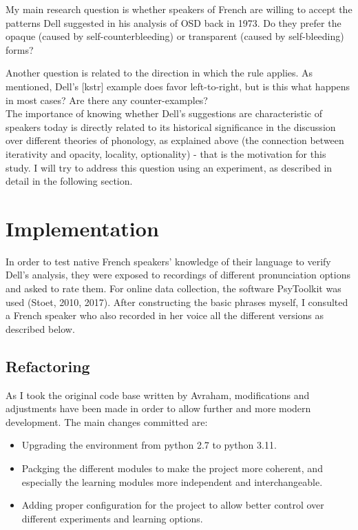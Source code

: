 \documentclass{article}
\begin{document}
My main research question is whether speakers of French are willing to accept the patterns Dell suggested in his analysis of OSD back in 1973.  Do they prefer the opaque (caused by self-counterbleeding) or transparent (caused by self-bleeding) forms?

Another question is related to the direction in which the rule applies. As mentioned,  Dell's [kstr] example does favor left-to-right, but is this what happens in most cases? Are there any counter-examples?\\

The importance of knowing whether Dell's suggestions are characteristic of speakers today is directly related to its historical significance in the discussion over different theories of phonology,  as explained above (the connection between iterativity and opacity, locality, optionality) - that is the motivation for this study. I will try to address this question using an experiment, as described in detail in the following section.

\clearpage
\section{Implementation} 
In order to test native French speakers' knowledge of their language to verify Dell's analysis, they were exposed to recordings of different pronunciation options and asked to rate them.  For online data collection,  the software PsyToolkit was used (Stoet, 2010, 2017). After constructing the basic phrases myself, I consulted a French speaker who also recorded in her voice all the different versions as described below. 

\subsection{Refactoring}
As I took the original code base written by Avraham, modifications and adjustments have been made in order to allow further and more modern development. The main changes committed are:
\begin{itemize}
  \item Upgrading the environment from python 2.7 to python 3.11.
  \item Packging the different modules to make the project more coherent, and especially the learning modules more independent and interchangeable.
  \item Adding proper configuration for the project to allow better control over different experiments and learning options.
\end{itemize}
\end{document}
